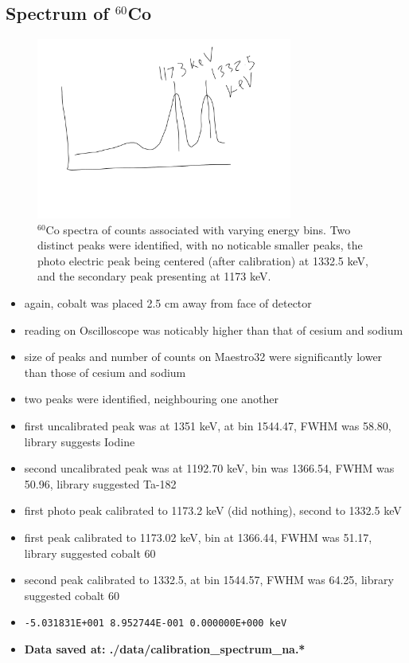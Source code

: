 \documentclass[a4paper]{article}
\begin{document}
\subsection{Spectrum of $^{60}$Co}
\begin{figure}[H]
    \centering
    \includegraphics[width=0.75\textwidth]{figures/cobalt_60_counts.pdf}
    \caption{$^{60}$Co spectra of counts associated with varying energy bins. Two distinct peaks were identified, with no noticable smaller peaks, the photo electric peak being centered (after calibration) at 1332.5 keV, and the secondary peak presenting at 1173 keV.}
\end{figure}
\begin{itemize}
    \item again, cobalt was placed 2.5 cm away from face of detector
    \item reading on Oscilloscope was noticably higher than that of cesium and sodium
    \item size of peaks and number of counts on Maestro32 were significantly lower than those of cesium and sodium
    \item two peaks were identified, neighbouring one another
    \item first uncalibrated peak was at 1351 keV, at bin 1544.47, FWHM was 58.80, library suggests Iodine
    \item second uncalibrated peak was at 1192.70 keV, bin was 1366.54, FWHM was 50.96, library suggested Ta-182
    \item first photo peak calibrated to 1173.2 keV (did nothing), second to 1332.5 keV
    \item first peak calibrated to 1173.02 keV, bin at 1366.44, FWHM was 51.17, library suggested cobalt 60
    \item second peak calibrated to 1332.5, at bin 1544.57, FWHM was 64.25, library suggested cobalt 60
    \item \verb|-5.031831E+001 8.952744E-001 0.000000E+000 keV|
    \item \textbf{Data saved at: ./data/calibration\_spectrum\_na.*}
\end{itemize}
\end{document}
